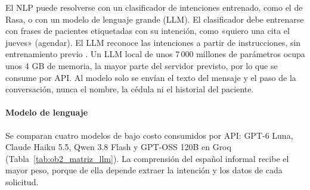 El NLP puede resolverse con un clasificador de intenciones entrenado, como el de Rasa, o con un modelo de lenguaje grande (LLM). El clasificador debe entrenarse con frases de pacientes etiquetadas con su intención, como «quiero una cita el jueves» (agendar). El LLM reconoce las intenciones a partir de instrucciones, sin entrenamiento previo \cite{zhao2023llmsurvey}. Un LLM local de unos 7\,000 millones de parámetros ocupa unos 4 GB de memoria, la mayor parte del servidor previsto, por lo que se consume por API. Al modelo solo se envían el texto del mensaje y el paso de la conversación, nunca el nombre, la cédula ni el historial del paciente.

\paragraph{Modelo de lenguaje}

Se comparan cuatro modelos de bajo costo consumidos por API: GPT-6 Luna, Claude Haiku 5.5, Qwen 3.8 Flash y GPT-OSS 120B en Groq (Tabla~\ref{tab:ob2_matriz_llm}). La comprensión del español informal recibe el mayor peso, porque de ella depende extraer la intención y los datos de cada solicitud.

